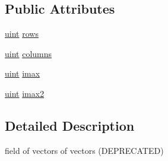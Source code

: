 \subsection*{Public Attributes}
\begin{DoxyCompactItemize}
\item 
\hyperlink{mdp__global__vars_8h_a91ad9478d81a7aaf2593e8d9c3d06a14}{uint} \hyperlink{classmdp__nvector__field_a8938e7e300995ed6733a2c405a80cfb3}{rows}
\item 
\hyperlink{mdp__global__vars_8h_a91ad9478d81a7aaf2593e8d9c3d06a14}{uint} \hyperlink{classmdp__nvector__field_a796e400fc808b5271faa95abb27ded15}{columns}
\item 
\hyperlink{mdp__global__vars_8h_a91ad9478d81a7aaf2593e8d9c3d06a14}{uint} \hyperlink{classmdp__nvector__field_a7c183e06584fdf73fedf889ef1186cdd}{imax}
\item 
\hyperlink{mdp__global__vars_8h_a91ad9478d81a7aaf2593e8d9c3d06a14}{uint} \hyperlink{classmdp__nvector__field_ac123ef55f792faa34a2429853f7872f6}{imax2}
\end{DoxyCompactItemize}


\subsection{Detailed Description}
field of vectors of vectors (DEPRECATED) 

